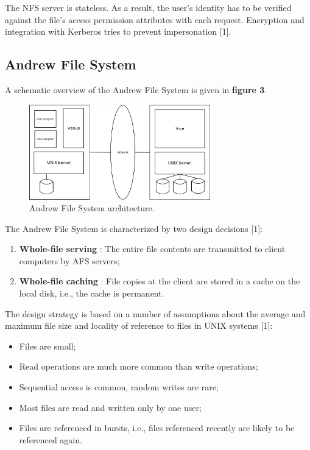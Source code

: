 The NFS server is stateless. As a result, the user's identity has to be verified against the file's access permission attributes with each request. Encryption and integration with Kerberos tries to prevent impersonation [1].







\subsection{Andrew File System}

A schematic overview of the Andrew File System is given in \textbf{figure 3}.

\begin{figure}
	\begin{center}
		\includegraphics[width=0.7\textwidth]{img/afs}
	\end{center}
	\caption{Andrew File System architecture.}
	\label{fig:afs}
\end{figure}


The Andrew File System is characterized by two design decisions [1]:
\begin{enumerate}
	\item \textbf{Whole-file serving} : The entire file contents are transmitted to client computers by AFS servers;
	\item \textbf{Whole-file caching} : File copies at the client are stored in a cache on the local disk, i.e., the cache is permanent.
\end{enumerate}

The design strategy is based on a number of assumptions about the average and maximum file size and locality of reference to files in UNIX systems [1]:
\begin{itemize}
	\item Files are small;
	\item Read operations are much more common than write operations;
	\item Sequential access is common, random writes are rare;
	\item Most files are read and written only by one user;
	\item Files are referenced in bursts, i.e., files referenced recently are likely to be referenced again.
\end{itemize}


